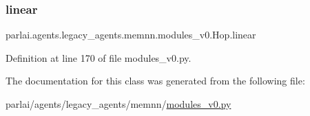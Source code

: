 \subsubsection{\texorpdfstring{linear}{linear}}
{\footnotesize\ttfamily parlai.\+agents.\+legacy\+\_\+agents.\+memnn.\+modules\+\_\+v0.\+Hop.\+linear}



Definition at line 170 of file modules\+\_\+v0.\+py.



The documentation for this class was generated from the following file\+:\begin{DoxyCompactItemize}
\item 
parlai/agents/legacy\+\_\+agents/memnn/\hyperlink{memnn_2modules__v0_8py}{modules\+\_\+v0.\+py}\end{DoxyCompactItemize}
